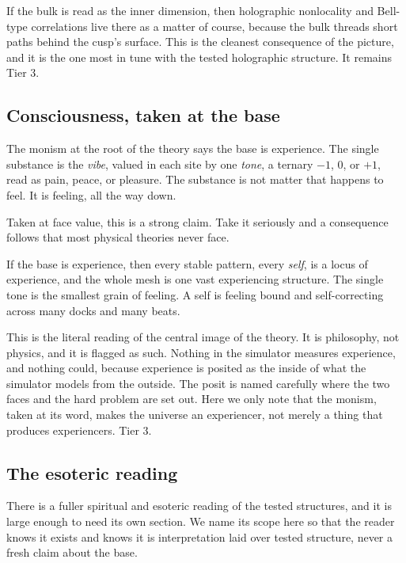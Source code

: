 \begin{result}
If the bulk is read as the inner dimension, then holographic nonlocality and Bell-type correlations live there as a matter of course, because the bulk threads short paths behind the cusp's surface. This is the cleanest consequence of the picture, and it is the one most in tune with the tested holographic structure. It remains Tier 3.
\end{result}

\subsection{Consciousness, taken at the base}

The monism at the root of the theory says the base is experience. The single substance is the \emph{vibe}, valued in each site by one \emph{tone}, a ternary $-1$, $0$, or $+1$, read as pain, peace, or pleasure. The substance is not matter that happens to feel. It is feeling, all the way down.

Taken at face value, this is a strong claim. Take it seriously and a consequence follows that most physical theories never face.

\begin{principle}
If the base is experience, then every stable pattern, every \emph{self}, is a locus of experience, and the whole mesh is one vast experiencing structure. The single tone is the smallest grain of feeling. A self is feeling bound and self-correcting across many docks and many beats.
\end{principle}

This is the literal reading of the central image of the theory. It is philosophy, not physics, and it is flagged as such. Nothing in the simulator measures experience, and nothing could, because experience is posited as the inside of what the simulator models from the outside. The posit is named carefully where the two faces and the hard problem are set out. Here we only note that the monism, taken at its word, makes the universe an experiencer, not merely a thing that produces experiencers. Tier 3.

\subsection{The esoteric reading}

There is a fuller spiritual and esoteric reading of the tested structures, and it is large enough to need its own section. We name its scope here so that the reader knows it exists and knows it is interpretation laid over tested structure, never a fresh claim about the base.

